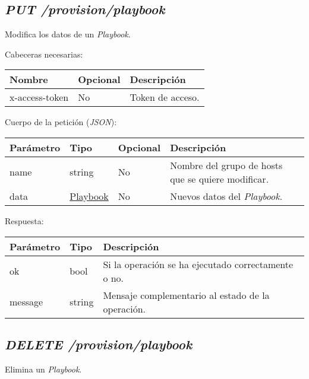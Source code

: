 	
	\subsection{\textit{PUT /provision/playbook}}
		Modifica los datos de un \textit{Playbook}.
		
		Cabeceras necesarias:
		\begin{table}[h!]
			\centering
	\begin{adjustbox}{max width=\textwidth}
			\begin{tabular}{|l|l|l|}
				\hline
				Nombre & Opcional & Descripción \\ \hline
				x-access-token & No & Token de acceso. \\ \hline
			\end{tabular}
\end{adjustbox}
		\end{table}
		
		Cuerpo de la petición (\textit{JSON}):
		\begin{table}[h!]
			\centering
	\begin{adjustbox}{max width=\textwidth}
			\begin{tabularx}{\linewidth}{|l|l|l|L|}
				\hline
				Parámetro & Tipo & Opcional & Descripción \\ \hline
				name & string & No & Nombre del grupo de hosts que se quiere modificar. \\ \hline
				data & \hyperref[sec:playbook]{Playbook} & No & Nuevos datos del \textit{Playbook}. \\ \hline
			\end{tabularx}
\end{adjustbox}
		\end{table}
		
		
		Respuesta:
		\begin{table}[h!]
			\centering
	\begin{adjustbox}{max width=\textwidth}
			\begin{tabular}{|l|l|l|}
				\hline
				Parámetro & Tipo & Descripción \\ \hline
				ok & bool & Si la operación se ha ejecutado correctamente o no. \\ \hline
				message & string & Mensaje complementario al estado de la operación. \\ \hline
			\end{tabular}
\end{adjustbox}
		\end{table}
	
	\subsection{\textit{DELETE /provision/playbook}}
		Elimina un \textit{Playbook}.
		
